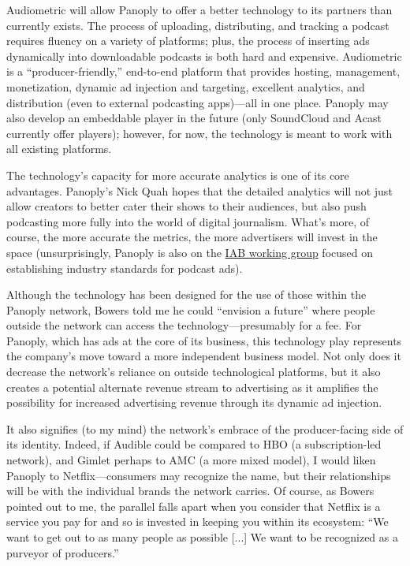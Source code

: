 \documentclass[notoc, symmetric, nobib, nols]{towcenter-guideto-book}
\begin{document}
Audiometric will allow Panoply to offer a better technology to its partners than currently exists. The process of uploading, distributing, and tracking a podcast requires fluency on a variety of platforms; plus, the process of inserting ads dynamically into downloadable podcasts is both hard and expensive. Audiometric is a ``producer-friendly,'' end-to-end platform that provides hosting, management, monetization, dynamic ad injection and targeting, excellent analytics, and distribution (even to external podcasting apps)---all in one place. Panoply may also develop an embeddable player in the future (only SoundCloud and Acast currently offer players); however, for now, the technology is meant to work with all existing platforms.\autocite{monaghan}

The technology's capacity for more accurate analytics is one of its core advantages. Panoply's Nick Quah hopes that the detailed analytics will not just allow creators to better cater their shows to their audiences, but also push podcasting more fully into the world of digital journalism.\autocite{quah} What's more, of course, the more accurate the metrics, the more advertisers will invest in the space (unsurprisingly, Panoply is also on the \href{http://www.iab.net/member_center/committees_councils/working_groups/Podcast_Business_Working_Group}{IAB working group} focused on establishing industry standards for podcast ads).

Although the technology has been designed for the use of those within the Panoply network, Bowers told me he could ``envision a future'' where people outside the network can access the technology---presumably for a fee.\autocite{bowers} For Panoply, which has ads at the core of its business, this technology play represents the company's move toward a more independent business model. Not only does it decrease the network's reliance on outside technological platforms, but it also creates a potential alternate revenue stream to advertising as it amplifies the possibility for increased advertising revenue through its dynamic ad injection. 

It also signifies (to my mind) the network's embrace of the producer-facing side of its identity. Indeed, if Audible could be compared to HBO (a subscription-led network), and Gimlet perhaps to AMC (a more mixed model), I would liken Panoply to Netflix---consumers may recognize the name, but their relationships will be with the individual brands the network carries. Of course, as Bowers pointed out to me, the parallel falls apart when you consider that Netflix is a service you pay for and so is invested in keeping you within its ecosystem: ``We want to get out to as many people as possible [...] We want to be recognized as a purveyor of producers.''\autocite{bowers} 
\end{document}
